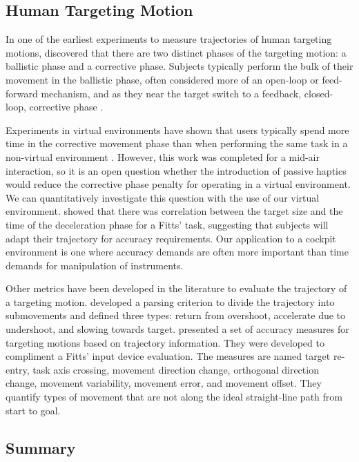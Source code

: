 \subsection{Human Targeting Motion}
\label{human-targeting-motion}

In one of the earliest experiments to measure trajectories of human targeting motions, \citet{woodworth_accuracy_1899} discovered that there are two distinct phases of the targeting motion: a ballistic phase and a corrective phase.
Subjects typically perform the bulk of their movement in the ballistic phase, often considered more of an open-loop or feed-forward mechanism, and as they near the target switch to a feedback, closed-loop, corrective phase \citep{elliott_control_1999}.

Experiments in virtual environments have shown that users typically spend more time in the corrective movement phase than when performing the same task in a non-virtual environment \citep{liu_comparing_2009}.
However, this work was completed for a mid-air interaction, so it is an open question whether the introduction of passive haptics would reduce the corrective phase penalty for operating in a virtual environment.
We can quantitatively investigate this question with the use of our virtual environment.
\citet{mackenzie_three-dimensional_1987} showed that there was correlation between the target size and the time of the deceleration phase for a Fitts' task, suggesting that subjects will adapt their trajectory for accuracy requirements.
Our application to a cockpit environment is one where accuracy demands are often more important than time demands for manipulation of instruments.

Other metrics have been developed in the literature to evaluate the trajectory of a targeting motion.
\citet{meyer_optimality_1988} developed a parsing criterion to divide the trajectory into submovements and defined three types: return from overshoot, accelerate due to undershoot, and slowing towards target.
\citet{mackenzie_accuracy_2001} presented a set of accuracy measures for targeting motions based on trajectory information.
They were developed to compliment a Fitts' input device evaluation.
The measures are named target re-entry, task axis crossing, movement direction change, orthogonal direction change, movement variability, movement error, and movement offset.
They quantify types of movement that are not along the ideal straight-line path from start to goal.

\subsection{Summary}
\label{summary}

